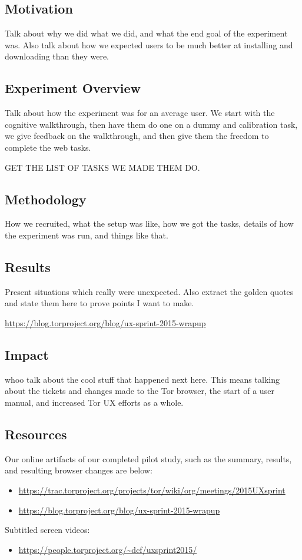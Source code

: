 \documentclass[letterpaper,twocolumn,10pt]{article}
\begin{document}
\subsection{Motivation}
Talk about why we did what we did, and what the end goal 
of the experiment was. Also talk about how we expected users
to be much better at installing and downloading than they were. 

\subsection{Experiment Overview}
Talk about how the experiment was for an average user. We start
with the cognitive walkthrough, then have them do one on a dummy
and calibration task, we give feedback on the walkthrough, and then 
give them the freedom to complete the web tasks. 

GET THE LIST OF TASKS WE MADE THEM DO. 

\subsection{Methodology}
How we recruited, what the setup was like, how we got the tasks, details of 
how the experiment was run, and things like that. 

\subsection{Results}
Present situations which really were unexpected. 
Also extract the golden quotes and state them here 
to prove points I want to make.  

\url{https://blog.torproject.org/blog/ux-sprint-2015-wrapup}

\subsection{Impact}
whoo talk about the cool stuff that happened next here. 
This means talking about the tickets and changes made 
to the Tor browser, the start of a user manual, and 
increased Tor UX efforts as a whole.

\subsection{Resources}

Our online artifacts of our completed pilot study, such as 
the summary, results, and resulting browser changes are below:
\begin{itemize} \itemsep1pt \parskip0pt 
\item \url{https://trac.torproject.org/projects/tor/wiki/org/meetings/2015UXsprint}
\item \url{https://blog.torproject.org/blog/ux-sprint-2015-wrapup}
\end{itemize}

\noindent Subtitled screen videos:
\begin{itemize} \itemsep1pt \parskip0pt 
\item \url{https://people.torproject.org/~dcf/uxsprint2015/}
\end{itemize}


 
\end{document}
